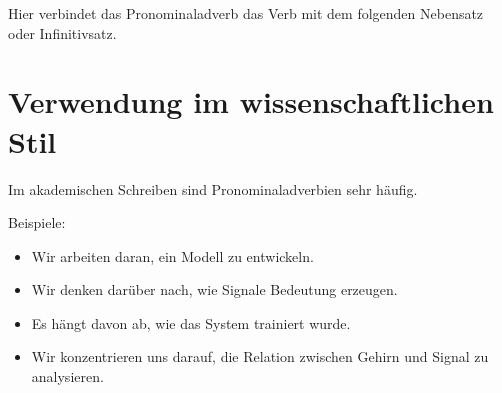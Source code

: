 \documentclass[a4paper]{article}
\begin{document}
        Hier verbindet das Pronominaladverb das Verb mit dem folgenden Nebensatz oder Infinitivsatz.
    
    
    \section{Verwendung im wissenschaftlichen Stil}
        
        Im akademischen Schreiben sind Pronominaladverbien sehr häufig.
        
        Beispiele:
        
        \begin{itemize}
            \item Wir arbeiten daran, ein Modell zu entwickeln.
            \item Wir denken darüber nach, wie Signale Bedeutung erzeugen.
            \item Es hängt davon ab, wie das System trainiert wurde.
            \item Wir konzentrieren uns darauf, die Relation zwischen Gehirn und Signal zu analysieren.
        \end{itemize}
\end{document}
